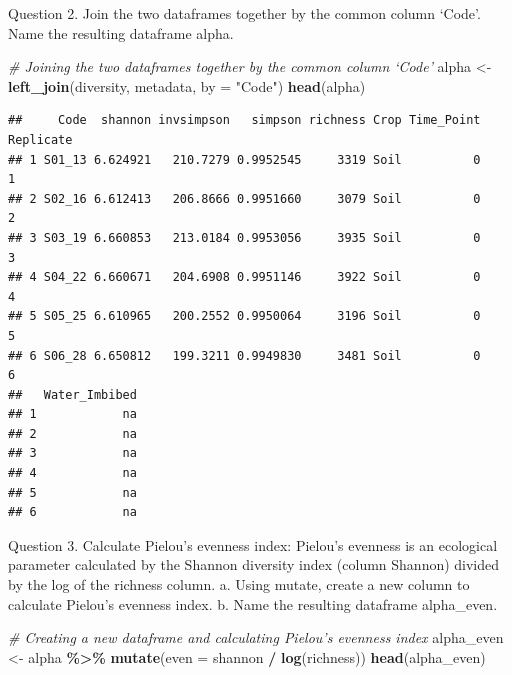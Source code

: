 \documentclass[
]{article}
\newenvironment{Shaded}{\begin{snugshade}}{\end{snugshade}}
\newcommand{\AttributeTok}[1]{\textcolor[rgb]{0.13,0.29,0.53}{#1}}
\newcommand{\CommentTok}[1]{\textcolor[rgb]{0.56,0.35,0.01}{\textit{#1}}}
\newcommand{\FunctionTok}[1]{\textcolor[rgb]{0.13,0.29,0.53}{\textbf{#1}}}
\newcommand{\NormalTok}[1]{#1}
\newcommand{\OtherTok}[1]{\textcolor[rgb]{0.56,0.35,0.01}{#1}}
\newcommand{\SpecialCharTok}[1]{\textcolor[rgb]{0.81,0.36,0.00}{\textbf{#1}}}
\newcommand{\StringTok}[1]{\textcolor[rgb]{0.31,0.60,0.02}{#1}}
\begin{document}
Question 2. Join the two dataframes together by the common column
`Code'. Name the resulting dataframe alpha.

\begin{Shaded}
\begin{Highlighting}[]
\CommentTok{\# Joining the two dataframes together by the common column ‘Code’}
\NormalTok{alpha }\OtherTok{\textless{}{-}} \FunctionTok{left\_join}\NormalTok{(diversity, metadata, }\AttributeTok{by =} \StringTok{"Code"}\NormalTok{)}
\FunctionTok{head}\NormalTok{(alpha)}
\end{Highlighting}
\end{Shaded}

\begin{verbatim}
##     Code  shannon invsimpson   simpson richness Crop Time_Point Replicate
## 1 S01_13 6.624921   210.7279 0.9952545     3319 Soil          0         1
## 2 S02_16 6.612413   206.8666 0.9951660     3079 Soil          0         2
## 3 S03_19 6.660853   213.0184 0.9953056     3935 Soil          0         3
## 4 S04_22 6.660671   204.6908 0.9951146     3922 Soil          0         4
## 5 S05_25 6.610965   200.2552 0.9950064     3196 Soil          0         5
## 6 S06_28 6.650812   199.3211 0.9949830     3481 Soil          0         6
##   Water_Imbibed
## 1            na
## 2            na
## 3            na
## 4            na
## 5            na
## 6            na
\end{verbatim}

Question 3. Calculate Pielou's evenness index: Pielou's evenness is an
ecological parameter calculated by the Shannon diversity index (column
Shannon) divided by the log of the richness column. a. Using mutate,
create a new column to calculate Pielou's evenness index. b. Name the
resulting dataframe alpha\_even.

\begin{Shaded}
\begin{Highlighting}[]
\CommentTok{\# Creating a new dataframe and calculating Pielou’s evenness index}
\NormalTok{alpha\_even }\OtherTok{\textless{}{-}}\NormalTok{ alpha }\SpecialCharTok{\%\textgreater{}\%}
  \FunctionTok{mutate}\NormalTok{(}\AttributeTok{even =}\NormalTok{ shannon }\SpecialCharTok{/} \FunctionTok{log}\NormalTok{(richness))}
\FunctionTok{head}\NormalTok{(alpha\_even)}
\end{Highlighting}
\end{Shaded}
\end{document}
